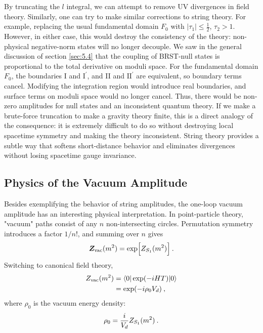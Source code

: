 By truncating the $l$ integral, we can attempt to remove UV divergences in field theory. 
Similarly, one can try to make similar corrections to string theory. For example, replacing the usual fundamental domain $F_{0}$ with $|\tau_{1}| \leq \frac{1}{2}$, $\tau_{2}>1$. 
However, in either case, this would destroy the consistency of the theory: non-physical negative-norm states will no longer decouple. We saw in the general discussion of section \ref{sec:5.4} that the coupling of BRST-null states is proportional to the total derivative on moduli space. 
For the fundamental domain $F_{0}$, the boundaries I and $\mathrm{I}^{\prime}$, and II and $\mathrm{II}^{\prime}$ are equivalent, so boundary terms cancel. Modifying the integration region would introduce real boundaries, and surface terms on moduli space would no longer cancel. Thus, there would be non-zero amplitudes for null states and an inconsistent quantum theory. If we make a brute-force truncation to make a gravity theory finite, this is a direct analogy of the consequence: it is extremely difficult to do so without destroying local spacetime symmetry and making the theory inconsistent. 
String theory provides a subtle way that softens short-distance behavior and eliminates divergences without losing spacetime gauge invariance. 

\subsection*{Physics of the Vacuum Amplitude} 
Besides exemplifying the behavior of string amplitudes, the one-loop vacuum amplitude has an interesting physical interpretation. In point-particle theory, "vacuum" paths consist of any $n$ non-intersecting circles. Permutation symmetry introduces a factor $1/n!$, and summing over $n$ gives 
\begin{equation}
	\bm{Z}_{\mathrm{vac}}(m^{2})=\exp \Bigl[Z_{S_{1}}(m^{2})\Bigr] \:. \label{7.3.17} 
\end{equation}
Switching to canonical field theory, 
\begin{align}
	Z_{\mathrm{vac}}(m^{2}) &= \langle 0|\exp (-i H T)| 0\rangle \nonumber \\
	&=\exp (-i \rho_{0} V_{d}) \:, \label{7.3.18} 
\end{align}
where $\rho_{0}$ is the vacuum energy density: 
\begin{equation}
	\rho_{0}=\frac{i}{V_{d}} Z_{S_{1}}(m^{2}) \:. \label{7.3.19} 
\end{equation}

